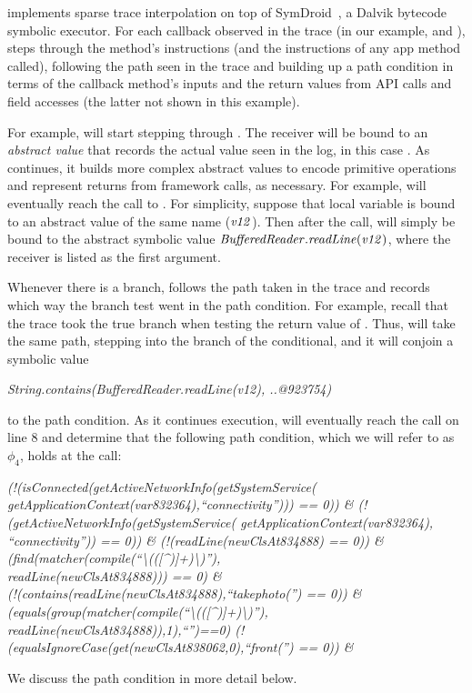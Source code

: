 \hogarth{} implements sparse trace interpolation on top of 
SymDroid~\cite{jeon:2012:symdroid}, a Dalvik bytecode symbolic
executor. For each callback observed in the trace (in our example,
 and ),
\hogarth{} steps through the method's instructions (and the
instructions of any app method called), following the path seen in the
trace and building up a path condition in terms of the callback
method's inputs and the return values from API calls and field
accesses (the latter not shown in this example).

For example, \hogarth{} will start stepping through
. The receiver  will be bound to an
\emph{abstract value} that records the actual value seen in the log,
in this case . As \hogarth{}
continues, it builds more complex abstract values to encode primitive operations
and represent returns from framework calls, as necessary. For example, \hogarth{}
will eventually reach the call to . For simplicity, suppose
that local variable  is bound to an abstract value of the
same name ($\mathit{v12}$). Then after the call,  will simply be bound to
the abstract symbolic value $\mathit{BufferedReader.readLine(v12)}$, where the
receiver is listed as the first argument.

Whenever there is a branch, \hogarth{} follows the path taken in the
trace and records which way the branch test went in the path
condition. For example, recall that the trace took the true branch
when testing the return value of . Thus, \hogarth{}
will take the same path, stepping into the  branch of the
conditional, and it will conjoin a symbolic value
\begin{center}
  \textit{String.contains(BufferedReader.readLine(v12), ..@923754)}
\end{center}
to the path condition. As it continues execution, \hogarth{} will
eventually reach the  call on line 8 and determine
that the following path condition, which we will refer to as $\phi_4$,
holds at the call:
\begin{center}
  \textit{
  (!(isConnected(getActiveNetworkInfo(getSystemService(
getApplicationContext(var832364),``connectivity''))) == 0)) \&
(!(getActiveNetworkInfo(getSystemService(
getApplicationContext(var832364), ``connectivity'')) == 0)) \&
 (!(readLine(newClsAt834888) == 0)) \&
(find(matcher(compile(``\textbackslash{}(([\textasciicircum{})]+)\textbackslash{})''), \\
readLine(newClsAt834888))) == 0) \& \\
(!(contains(readLine(newClsAt834888),``takephoto('') == 0)) \&
(equals(group(matcher(compile(``\textbackslash(([\textasciicircum{})]+)\textbackslash)''),
readLine(newClsAt834888)),1),``'')==0)
 (!(equalsIgnoreCase(get(newClsAt838062,0),``front('') == 0)) \&
}
\end{center}
We discuss the path condition in more detail below.


